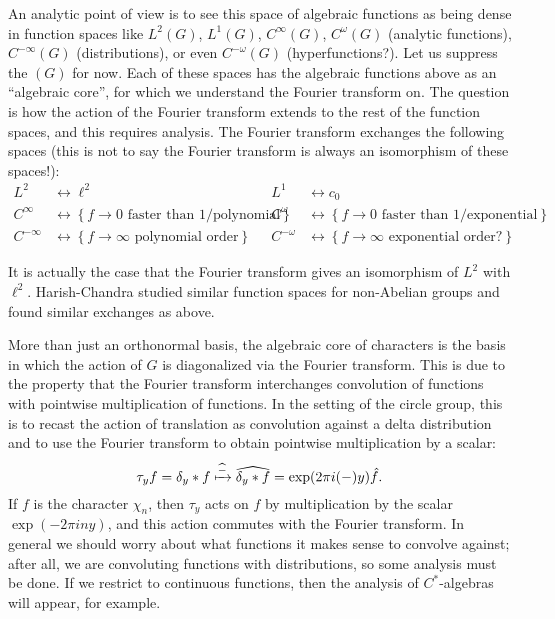 \documentclass[11pt,leqno]{article}
\theoremstyle{plain}
\theoremstyle{definition}
\numberwithin{equation}{section}
\numberwithin{lem}{section}
\newcommand{\cbr}[1]{\left\{#1\right\}}
\begin{document}
An analytic point of view is to see this space of algebraic functions as being dense in function spaces like $L^2(G)$, $L^1(G)$, $C^\infty(G)$, $C^\omega(G)$ (analytic functions), $C^{-\infty}(G)$ (distributions), or even $C^{-\omega}(G)$ (hyperfunctions?). Let us suppress the $(G)$ for now. Each of these spaces has the algebraic functions above as an ``algebraic core'', for which we understand the Fourier transform on. The question is how the action of the Fourier transform extends to the rest of the function spaces, and this requires analysis. The Fourier transform exchanges the following spaces (this is not to say the Fourier transform is always an isomorphism of these spaces!):
\begin{align*}
	L^2 &\longleftrightarrow \ell^2 & L^1 &\longleftrightarrow c_0\\
	C^\infty &\longleftrightarrow \cbr{f\to 0 \text{ faster than } 1/\text{polynomial}} & C^\omega &\longleftrightarrow \cbr{f\to 0 \text{ faster than } 1/\text{exponential}}\\
	C^{-\infty} &\longleftrightarrow \cbr{f\to \infty \text{ polynomial order}} & C^{-\omega} &\longleftrightarrow \cbr{f\to \infty \text{ exponential order?}}
\end{align*}

It is actually the case that the Fourier transform gives an isomorphism of $L^2$ with $\ell^2$. Harish-Chandra studied similar function spaces for non-Abelian groups and found similar exchanges as above.

More than just an orthonormal basis, the algebraic core of characters is the basis in which the action of $G$ is diagonalized via the Fourier transform. This is due to the property that the Fourier transform interchanges convolution of functions with pointwise multiplication of functions. In the setting of the circle group, this is to recast the action of translation as convolution against a delta distribution and to use the Fourier transform to obtain pointwise multiplication by a scalar:
\[\tau_yf = \delta_y\ast f\xmapsto{\widehat{-}} \widehat{\delta_y\ast f} = \exp(2\pi i(-)y)\hat f.\]
If $f$ is the character $\chi_n$, then $\tau_y$ acts on $f$ by multiplication by the scalar $\exp(-2\pi iny)$, and this action commutes with the Fourier transform. In general we should worry about what functions it makes sense to convolve against; after all, we are convoluting functions with distributions, so some analysis must be done. If we restrict to continuous functions, then the analysis of $C^\ast$-algebras will appear, for example.
\end{document}
